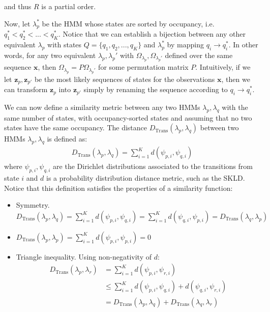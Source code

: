 \documentclass[pdftex,11pt,a4paper]{article}
\theoremstyle{definition}
\theoremstyle{remark}
\newcommand*{\V}[1]{\mathbf{#1}}%
\begin{document}
and thus $R$ is a partial order.
\par Now, let $\lambda_p^\text{*}$ be the HMM whose states are sorted by occupancy, i.e. $q_1^\text{*} < q_2^\text{*} < ... < q_K^\text{*}$. Notice that we can establish a bijection between any other equivalent $\lambda_p$ with states $Q = \{q_1, q_2, ..., q_K\}$ and $\lambda_p^\text{*}$ by mapping $q_i \rightarrow q_i^\text{*}$. In other words, for any two equivalent $\lambda_p, \lambda_p'$ with $\Omega_{\lambda_p}, \Omega_{\lambda_p'}$ defined over the same sequence $\V{x}$, then $\Omega_{\lambda_p} = P\Omega_{\lambda_p'}$ for some permutation matrix $P$. Intuitively, if we let $\V{z}_p, \V{z}_{p'}$ be the most likely sequences of states for the observations $\V{x}$, then we can transform $\V{z}_p$ into $\V{z}_{p'}$ simply by renaming the sequence according to $q_i \rightarrow q_i^\text{*}$. 
\par We can now define a similarity metric between any two HMMs $\lambda_p, \lambda_q$ with the same number of states, with occupancy-sorted states and assuming that no two states have the same occupancy. The distance $D_{\text{Trans}}(\lambda_p, \lambda_q)$ between two HMMs $\lambda_p, \lambda_q$ is defined as:
\begin{align*}
D_{\text{Trans}}(\lambda_p, \lambda_q) = \sum_{i=1}^K d(\psi_{p, i}, \psi_{q, i})
\end{align*}
where $\psi_{p, i}, \psi_{q, i}$ are the Dirichlet distributions associated to the transitions from state $i$ and $d$ is a probability distribution distance metric, such as the SKLD. Notice that this definition satisfies the properties of a similarity function:
\begin{itemize}
\item Symmetry. $D_{\text{Trans}}(\lambda_p, \lambda_q) = \sum_{i=1}^K d(\psi_{p, i}, \psi_{q, i}) = \sum_{i=1}^K d(\psi_{q, i}, \psi_{p, i}) = D_{\text{Trans}}(\lambda_q, \lambda_p)$
\item $D_{\text{Trans}}(\lambda_p, \lambda_p) = \sum_{i=1}^K d(\psi_{p, i}, \psi_{p, i}) = 0$
\item Triangle inequality. Using non-negativity of $d$:
\begin{align*}
D_{\text{Trans}}(\lambda_p, \lambda_r) &= \sum_{i=1}^K d(\psi_{p, i}, \psi_{r, i}) \\
&\leq \sum_{i=1}^K d(\psi_{p, i}, \psi_{q, i}) + d(\psi_{q, i}, \psi_{r, i})\\
&= D_{\text{Trans}}(\lambda_p, \lambda_q) + D_{\text{Trans}}(\lambda_q, \lambda_r)
\end{align*}
\end{itemize}
\end{document}
